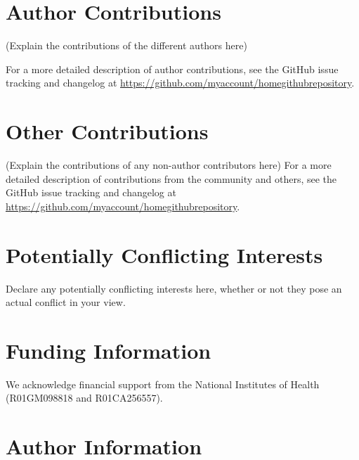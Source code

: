 \documentclass[9pt,tutorial]{livecoms}
\newcommand{\githubrepository}{\url{https://github.com/myaccount/homegithubrepository}}  %
\begin{document}
\section{Author Contributions}
%

(Explain the contributions of the different authors here)

For a more detailed description of author contributions,
see the GitHub issue tracking and changelog at \githubrepository.

\section{Other Contributions}
%

(Explain the contributions of any non-author contributors here)
For a more detailed description of contributions from the community and others, see the GitHub issue tracking and changelog at \githubrepository.

\section{Potentially Conflicting Interests}

Declare any potentially conflicting interests here, whether or not they pose an actual conflict in your view.

\section{Funding Information}
We acknowledge financial support from the National Institutes of Health (R01GM098818 and R01CA256557).

\section*{Author Information}
\makeorcid




\end{document}
